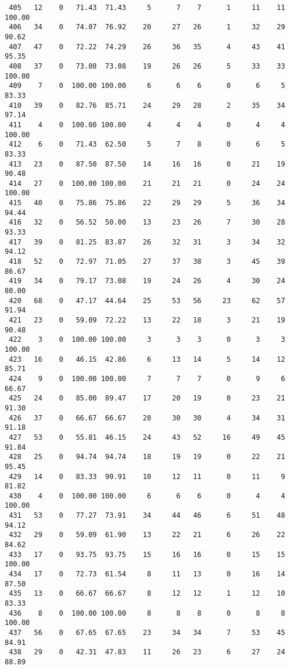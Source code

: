 \begin{verbatim}
 405   12    0   71.43  71.43     5      7    7      1     11    11   100.00
 406   34    0   74.07  76.92    20     27   26      1     32    29    90.62
 407   47    0   72.22  74.29    26     36   35      4     43    41    95.35
 408   37    0   73.08  73.08    19     26   26      5     33    33   100.00
 409    7    0  100.00 100.00     6      6    6      0      6     5    83.33
 410   39    0   82.76  85.71    24     29   28      2     35    34    97.14
 411    4    0  100.00 100.00     4      4    4      0      4     4   100.00
 412    6    0   71.43  62.50     5      7    8      0      6     5    83.33
 413   23    0   87.50  87.50    14     16   16      0     21    19    90.48
 414   27    0  100.00 100.00    21     21   21      0     24    24   100.00
 415   40    0   75.86  75.86    22     29   29      5     36    34    94.44
 416   32    0   56.52  50.00    13     23   26      7     30    28    93.33
 417   39    0   81.25  83.87    26     32   31      3     34    32    94.12
 418   52    0   72.97  71.05    27     37   38      3     45    39    86.67
 419   34    0   79.17  73.08    19     24   26      4     30    24    80.00
 420   68    0   47.17  44.64    25     53   56     23     62    57    91.94
 421   23    0   59.09  72.22    13     22   18      3     21    19    90.48
 422    3    0  100.00 100.00     3      3    3      0      3     3   100.00
 423   16    0   46.15  42.86     6     13   14      5     14    12    85.71
 424    9    0  100.00 100.00     7      7    7      0      9     6    66.67
 425   24    0   85.00  89.47    17     20   19      0     23    21    91.30
 426   37    0   66.67  66.67    20     30   30      4     34    31    91.18
 427   53    0   55.81  46.15    24     43   52     16     49    45    91.84
 428   25    0   94.74  94.74    18     19   19      0     22    21    95.45
 429   14    0   83.33  90.91    10     12   11      0     11     9    81.82
 430    4    0  100.00 100.00     6      6    6      0      4     4   100.00
 431   53    0   77.27  73.91    34     44   46      6     51    48    94.12
 432   29    0   59.09  61.90    13     22   21      6     26    22    84.62
 433   17    0   93.75  93.75    15     16   16      0     15    15   100.00
 434   17    0   72.73  61.54     8     11   13      0     16    14    87.50
 435   13    0   66.67  66.67     8     12   12      1     12    10    83.33
 436    8    0  100.00 100.00     8      8    8      0      8     8   100.00
 437   56    0   67.65  67.65    23     34   34      7     53    45    84.91
 438   29    0   42.31  47.83    11     26   23      6     27    24    88.89

\end{verbatim}
